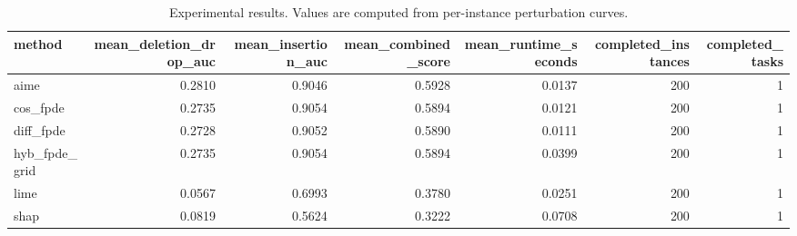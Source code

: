 \begin{table}[t]
\caption{Experimental results. Values are computed from per-instance perturbation curves.}
\label{tab:main_results_computed}
\centering
\begin{tabular}{lrrrrrr}
\toprule
method & mean\_deletion\_drop\_auc & mean\_insertion\_auc & mean\_combined\_score & mean\_runtime\_seconds & completed\_instances & completed\_tasks \\
\midrule
aime & 0.2810 & 0.9046 & 0.5928 & 0.0137 & 200 & 1 \\
cos\_fpde & 0.2735 & 0.9054 & 0.5894 & 0.0121 & 200 & 1 \\
diff\_fpde & 0.2728 & 0.9052 & 0.5890 & 0.0111 & 200 & 1 \\
hyb\_fpde\_grid & 0.2735 & 0.9054 & 0.5894 & 0.0399 & 200 & 1 \\
lime & 0.0567 & 0.6993 & 0.3780 & 0.0251 & 200 & 1 \\
shap & 0.0819 & 0.5624 & 0.3222 & 0.0708 & 200 & 1 \\
\bottomrule
\end{tabular}

\end{table}
